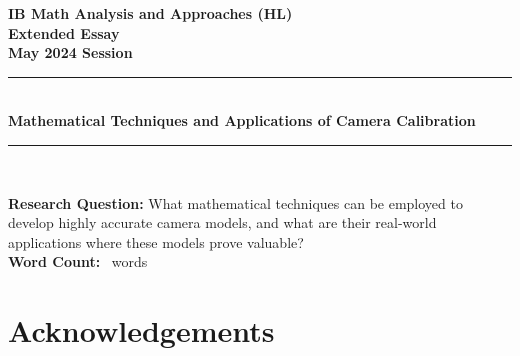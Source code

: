 \documentclass[12pt, oneside]{article}
\begin{document}
\pagestyle{frontmatter}

\begin{titlepage}
    \large

    \begin{center}

        \vspace*{2cm}

        {\bfseries
            IB Math Analysis and Approaches (HL) \\
            Extended Essay\\
            May 2024 Session}\\

        \vspace*{\fill}

        \rule{\linewidth}{1.5pt} \\ [0.5cm]
        {\LARGE \bfseries Mathematical Techniques and Applications of Camera Calibration}
        \rule{\linewidth}{0.5pt} \\

        \vspace*{\fill}

        \textbf{Research Question:} What mathematical techniques can be employed to develop highly accurate camera models, and what are their real-world applications where these models prove valuable? \\ [1cm]

        \textbf{Word Count:} \printwordcount\ words

        \vspace*{2cm}

    \end{center}

\end{titlepage}

\tableofcontents
\clearpage
\pagestyle{mainmatter}
\setcounter{page}{1}










\section*{Acknowledgements}
\end{document}
